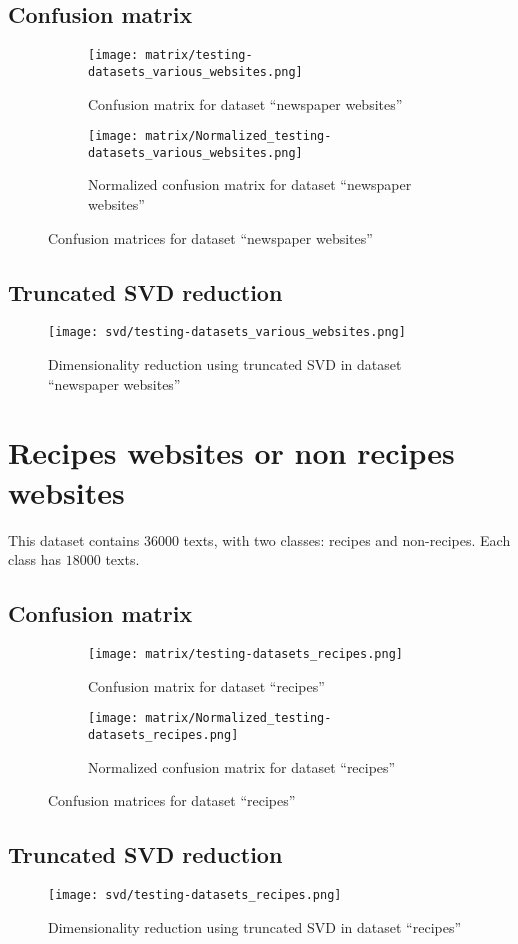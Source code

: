 \documentclass[\main/main.tex]{subfiles}
\begin{document}
\subsection{Confusion matrix}
\begin{figure}
	\begin{subfigure}{0.40\textwidth}
		\texttt{[image: matrix/testing-datasets\_various\_websites.png]}
		\caption{Confusion matrix for dataset ``newspaper websites''}
	\end{subfigure}
	\begin{subfigure}{0.40\textwidth}
		\texttt{[image: matrix/Normalized\_testing-datasets\_various\_websites.png]}
		\caption{Normalized confusion matrix for dataset ``newspaper websites''}
	\end{subfigure}
	\caption{Confusion matrices for dataset ``newspaper websites''}
\end{figure}
\subsection{Truncated SVD reduction}
\begin{figure}
	\texttt{[image: svd/testing-datasets\_various\_websites.png]}
	\caption{Dimensionality reduction using truncated SVD in dataset ``newspaper websites''}
\end{figure}

\clearpage
\section{Recipes websites or non recipes websites}
This dataset contains \(36000\) texts, with two classes: recipes and non-recipes. Each class has \(18000\) texts.
\subsection{Confusion matrix}
\begin{figure}
	\begin{subfigure}{0.40\textwidth}
		\texttt{[image: matrix/testing-datasets\_recipes.png]}
		\caption{Confusion matrix for dataset ``recipes''}
	\end{subfigure}
	\begin{subfigure}{0.40\textwidth}
		\texttt{[image: matrix/Normalized\_testing-datasets\_recipes.png]}
		\caption{Normalized confusion matrix for dataset ``recipes''}
	\end{subfigure}
	\caption{Confusion matrices for dataset ``recipes''}
\end{figure}
\subsection{Truncated SVD reduction}
\begin{figure}
	\texttt{[image: svd/testing-datasets\_recipes.png]}
	\caption{Dimensionality reduction using truncated SVD in dataset ``recipes''}
\end{figure}
\end{document}
